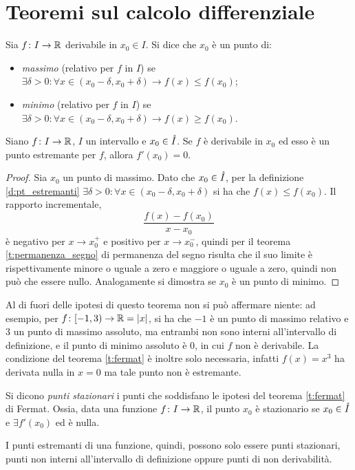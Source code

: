 \section{Teoremi sul calcolo differenziale}
\begin{definizione}
\label{d:pt_estremanti}
Sia $f\colon I\to\mathbb{R}$ derivabile in $x_0\in I$. Si dice che $x_0$ è un punto di:
\begin{itemize}
\item \emph{massimo} (relativo per $f$ in $I$) se $\exists\delta>0\colon\forall x\in(x_0-\delta,x_0+\delta)\rightarrow f(x)\leq f(x_0)$;
\item \emph{minimo} (relativo per $f$ in $I$) se $\exists\delta>0\colon\forall x\in(x_0-\delta,x_0+\delta)\rightarrow f(x)\geq f(x_0)$.
\end{itemize}
\end{definizione}
\begin{teorema}[di Fermat]
\label{t:fermat}
Siano $f\colon I\to\mathbb{R}$, $I$ un intervallo e $x_0\in\mathring{I}$. Se $f$ è derivabile in $x_0$ ed esso è un punto estremante per $f$, allora $f'(x_0)=0$.
\end{teorema}
\begin{proof}
Sia $x_0$ un punto di massimo. Dato che $x_0\in\mathring{I}$, per la definizione \ref{d:pt_estremanti} $\exists\delta>0\colon\forall x\in(x_0-\delta,x_0+\delta)$ si ha che $f(x)\leq f(x_0)$. Il rapporto incrementale,
\[
\frac{f(x)-f(x_0)}{x-x_0}
\]
è negativo per $x\to x_0^+$ e positivo per $x\to x_0^-$, quindi per il teorema \ref{t:permanenza_segno} di permanenza del segno risulta che il suo limite è rispettivamente minore o uguale a zero e maggiore o uguale a zero, quindi non può che essere nullo.
Analogamente si dimostra se $x_0$ è un punto di minimo.
\end{proof}
Al di fuori delle ipotesi di questo teorema non si può affermare niente: ad esempio, per $f\colon[-1,3)\to\mathbb{R}=\lvert x\rvert$, si ha che $-1$ è un punto di massimo relativo e 3 un punto di massimo assoluto, ma entrambi non sono interni all'intervallo di definizione, e il punto di minimo assoluto è 0, in cui $f$ non è derivabile.
La condizione del teorema \ref{t:fermat} è inoltre solo necessaria, infatti $f(x)=x^3$ ha derivata nulla in $x=0$ ma tale punto non è estremante.
\begin{definizione}
Si dicono \emph{punti stazionari} i punti che soddisfano le ipotesi del teorema \ref{t:fermat} di Fermat. Ossia, data una funzione $f\colon I\to\mathbb{R}$, il punto $x_0$ è stazionario se $x_0\in\mathring{I}$ e $\exists f'(x_0)$ ed è nulla.
\end{definizione}
I punti estremanti di una funzione, quindi, possono solo essere punti stazionari, punti non interni all'intervallo di definizione oppure punti di non derivabilità.

